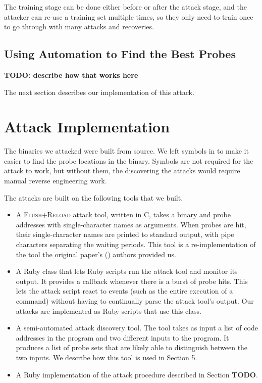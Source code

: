 \documentclass[letterpaper,twocolumn,10pt]{article}
\begin{document}
The training stage can be done either before or after the attack stage, and the
attacker can re-use a training set multiple times, so they only need to train
once to go through with many attacks and recoveries.

\subsection{Using Automation to Find the Best Probes}

\textbf{TODO: describe how that works here}

The next section describes our implementation of this attack.

\section{Attack Implementation}

The binaries we attacked were built from source. We left symbols in to make it
easier to find the probe locations in the binary. Symbols are not required for
the attack to work, but without them, the discovering the attacks would require
manual reverse engineering work.

The attacks are built on the following tools that we built.

\begin{itemize}
    \item A \textsc{Flush+Reload} attack tool, written in C, takes a binary and probe
        addresses with single-character names as arguments. When probes are hit,
        their single-character names are printed to standard output, with pipe
        characters separating the waiting periods. This tool is
        a re-implementation of the tool the original paper's
        (\cite{yarom2013flush}) authors provided us.

    \item A Ruby class that lets Ruby scripts run the attack tool and monitor
        its output. It provides a callback whenever there is a burst of probe
        hits. This lets the attack script react to events (such as the entire
        execution of a command) without having to continually parse the attack
        tool's output. Our attacks are implemented as Ruby scripts that use this
        class.

    \item A semi-automated attack discovery tool. The tool takes as input a list
        of code addresses in the program and two different inputs to the
        program. It produces a list of probe sets that are likely able to
        distinguish between the two inputs. We describe how this tool is used in
        Section 5.

    \item A Ruby implementation of the attack procedure described in Section
          \textbf{TODO}.
\end{itemize}
\end{document}
